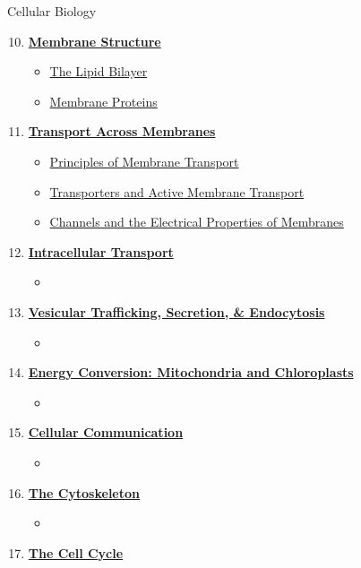 \documentclass[12pt,letterpaper]{article}
\begin{document}
\begin{contbox}{Cellular Biology}{ 
\begin{enumerate}[font=\bfseries, wide]
    \setcounter{enumi}{9}
    \item \hyperlink{10}{\textbf{Membrane Structure}}
    \begin{itemize}
        \item \hyperlink{10.1a}{The Lipid Bilayer}
        \item \hyperlink{10.2a}{Membrane Proteins}
    \end{itemize}
    \item \hyperlink{11}{\textbf{Transport Across Membranes}}
    \begin{itemize}
        \item \hyperlink{11.1}{Principles of Membrane Transport}
        \item \hyperlink{11.2}{Transporters and Active Membrane Transport}
        \item \hyperlink{11.3}{Channels and the Electrical Properties of Membranes}
    \end{itemize}
    \item \hyperlink{12}{\textbf{Intracellular Transport}}
    \begin{itemize}
        \item 
    \end{itemize}
    \item \hyperlink{13}{\textbf{Vesicular Trafficking, Secretion, \& Endocytosis}}
    \begin{itemize}
        \item
    \end{itemize}
    \item \hyperlink{14}{\textbf{Energy Conversion: Mitochondria and Chloroplasts}}
    \begin{itemize}
        \item 
    \end{itemize}
    \item \hyperlink{15}{\textbf{Cellular Communication}}
    \begin{itemize}
        \item 
    \end{itemize}
    \item \hyperlink{16}{\textbf{The Cytoskeleton}}
    \begin{itemize}
        \item 
    \end{itemize}
    \item \hyperlink{17}{\textbf{The Cell Cycle}}

\end{enumerate}}
\end{contbox}
\end{document}
